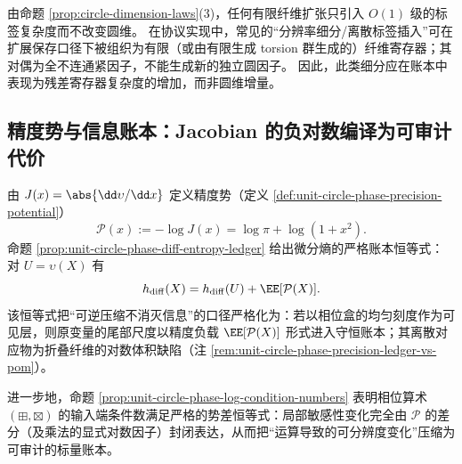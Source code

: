 \begin{remark}[细分与纤维标签不增圆维]\label{rem:circle-dimension-refinement}
由命题 \ref{prop:circle-dimension-laws}(3)，任何有限纤维扩张只引入 \(O(1)\) 级的标签复杂度而不改变圆维。
在协议实现中，常见的“分辨率细分/离散标签插入”可在扩展保存口径下被组织为有限（或由有限生成 torsion 群生成的）纤维寄存器；其对偶为全不连通紧因子，不能生成新的独立圆因子。
因此，此类细分应在账本中表现为残差寄存器复杂度的增加，而非圆维增量。
\end{remark}





















\subsection{精度势与信息账本：Jacobian 的负对数编译为可审计代价}\label{subsec:cdim-precision-ledger}
由 \(J(x)=\abs{\dd\upsilon/\dd x}\) 定义精度势（定义 \ref{def:unit-circle-phase-precision-potential}）
\[
\mathcal{P}(x):=-\log J(x)=\log\pi+\log(1+x^2).
\]
命题 \ref{prop:unit-circle-phase-diff-entropy-ledger} 给出微分熵的严格账本恒等式：对 \(U=\upsilon(X)\) 有
\[
h_{\mathrm{diff}}(X)=h_{\mathrm{diff}}(U)+\EE[\mathcal{P}(X)].
\]
该恒等式把“可逆压缩不消灭信息”的口径严格化为：若以相位盒的均匀刻度作为可见层，则原变量的尾部尺度以精度负载 \(\EE[\mathcal P(X)]\) 形式进入守恒账本；其离散对应物为折叠纤维的对数体积缺陷（注 \ref{rem:unit-circle-phase-precision-ledger-vs-pom}）。
\par
进一步地，命题 \ref{prop:unit-circle-phase-log-condition-numbers} 表明相位算术 \((\boxplus,\boxtimes)\) 的输入端条件数满足严格的势差恒等式：局部敏感性变化完全由 \(\mathcal P\) 的差分（及乘法的显式对数因子）封闭表达，从而把“运算导致的可分辨度变化”压缩为可审计的标量账本。

